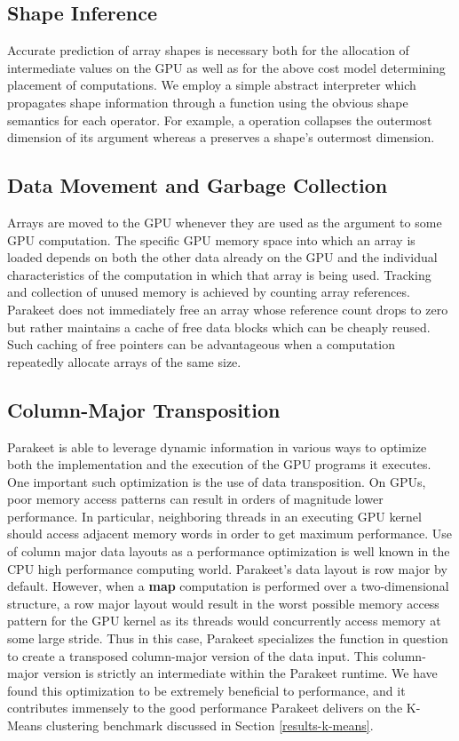\documentclass[preprint]{sigplanconf}
\begin{document}
\subsection{Shape Inference}
\label{shapeinference}
Accurate prediction of array shapes is necessary both for the allocation of intermediate values on the GPU as well as for the above cost model determining placement of computations. We employ a simple abstract interpreter which propagates shape information through a function using the obvious shape semantics for each operator. For example, a \REDUCE\; operation collapses the outermost dimension of its argument whereas a \MAP\; preserves a shape's outermost dimension. 

\subsection{Data Movement and Garbage Collection} 
Arrays are moved to the GPU whenever they are used as the argument to some GPU computation. The specific GPU memory space into which an array is loaded depends on both the other data already on the GPU and the individual characteristics of the computation in which that array is being used. Tracking and collection of unused memory is achieved by counting array references. Parakeet does not immediately free an array whose reference count drops to zero but rather maintains a cache of free data blocks which can be cheaply reused. Such caching of free pointers can be advantageous when a computation repeatedly allocate arrays of the same size. 

\subsection{Column-Major Transposition}
\label{colmajor}

Parakeet is able to leverage dynamic information in various ways to optimize both the implementation and the execution of the GPU programs it executes.  One important such optimization is the use of data transposition.  On GPUs, poor memory access patterns can result in orders of magnitude lower performance.  In particular, neighboring threads in an executing GPU kernel should access adjacent memory words in order to get maximum performance.  Use of column major data layouts as a performance optimization is well known in the CPU high performance computing world.  Parakeet's data layout is row major by default.  However, when a \textbf{map} computation is performed over a two-dimensional structure, a row major layout would result in the worst possible memory access pattern for the GPU kernel as its threads would concurrently access memory at some large stride.  Thus in this case, Parakeet specializes the function in question to create a transposed column-major version of the data input.  This column-major version is strictly an intermediate within the Parakeet runtime.  We have found this optimization to be extremely beneficial to performance, and it contributes immensely to the good performance Parakeet delivers on the K-Means clustering benchmark discussed in Section \ref{results-k-means}.
\end{document}
